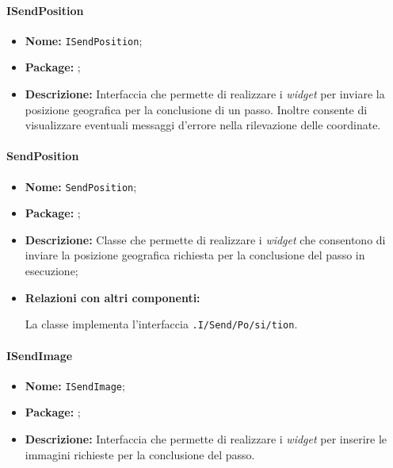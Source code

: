 \paragraph{ISendPosition}
\begin{itemize}
\item \textbf{Nome:} \texttt{ISendPosition};
\item \textbf{Package:} \texttt{\viewUser{}};
\item \textbf{Descrizione:} Interfaccia che permette  di realizzare i \textit{widget} per inviare la posizione geografica per la conclusione di un passo. Inoltre consente di visualizzare eventuali messaggi d'errore nella rilevazione delle coordinate.
\end{itemize}

\paragraph{SendPosition}
\begin{flushleft}
\begin{itemize}
\item \textbf{Nome:} \texttt{SendPosition};
\item \textbf{Package:} \texttt{\viewUser{}};
\item \textbf{Descrizione:} Classe che permette  di realizzare i \textit{widget} che consentono di inviare la posizione geografica richiesta per la conclusione del passo in esecuzione;
\item \textbf{Relazioni con altri componenti:}
\begin{sloppypar}
La classe implementa l'interfaccia \texttt{\viewUser{}.I\fshyp{}Send\fshyp{}Po\fshyp{}si\fshyp{}tion}.
\end{sloppypar}
\end{itemize}
\end{flushleft}

\paragraph{ISendImage}
\begin{itemize}
\item \textbf{Nome:} \texttt{ISendImage};
\item \textbf{Package:} \texttt{\viewUser{}};
\item \textbf{Descrizione:} Interfaccia che permette di realizzare i \textit{widget} per inserire le immagini richieste per la conclusione del passo.
\end{itemize}

